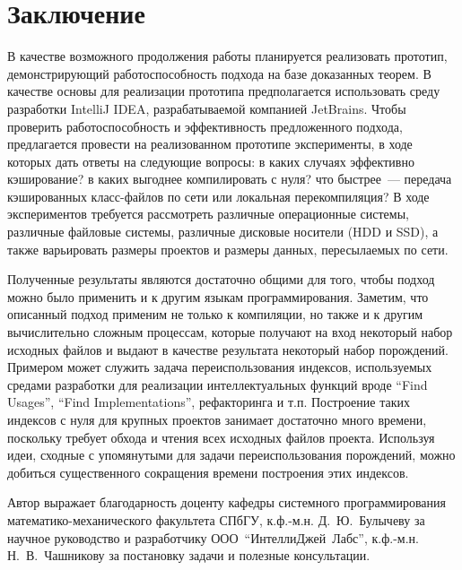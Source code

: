 \section*{Заключение}
В качестве возможного продолжения работы планируется реализовать прототип, демонстрирующий работоспособность подхода на базе доказанных теорем. В качестве основы для реализации прототипа предполагается использовать среду разработки IntelliJ IDEA, разрабатываемой компанией JetBrains. Чтобы проверить работоспособность и эффективность предложенного подхода, предлагается провести на реализованном прототипе эксперименты, в ходе которых дать ответы на следующие вопросы: в каких случаях эффективно кэширование? в каких выгоднее компилировать с нуля? что быстрее~--- передача кэшированных класс-файлов по сети или локальная перекомпиляция? В ходе экспериментов требуется рассмотреть различные операционные системы, различные файловые системы, различные дисковые носители (HDD и SSD), а также варьировать размеры проектов и размеры данных, пересылаемых по сети.

Полученные результаты являются достаточно общими для того, чтобы подход можно было применить и к другим языкам программирования. Заметим, что описанный подход применим не только к компиляции, но также и к другим вычислительно сложным процессам, которые получают на вход некоторый набор исходных файлов и выдают в качестве результата некоторый набор порождений. Примером может служить задача переиспользования индексов, используемых средами разработки для реализации интеллектуальных функций вроде ``Find Usages'', ``Find Implementations'', рефакторинга и т.п. Построение таких индексов с нуля для крупных проектов занимает достаточно много времени, поскольку требует обхода и чтения всех исходных файлов проекта. Используя идеи, сходные с упомянутыми для задачи переиспользования порождений, можно добиться существенного сокращения времени построения этих индексов.

Автор выражает благодарность доценту кафедры системного программирования математико-механического факультета СПбГУ, \mbox{к.ф.-м.н.} Д.~Ю.~Булычеву за научное руководство и разработчику \mbox{ООО~``ИнтеллиДжей Лабс''}, \mbox{к.ф.-м.н.} Н.~В.~Чашникову за постановку задачи и полезные консультации.